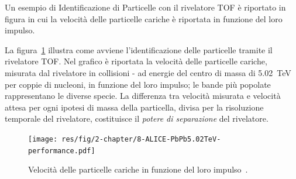     Un esempio di Identificazione di Particelle con il rivelatore TOF è riportato in figura in cui la velocità delle particelle cariche è riportata in funzione del loro impulso.

    La figura~\ref{fig:2-8-ALICE-PbPb5.02TeV-performance} illustra come avviene l'identificazione delle particelle tramite il rivelatore TOF. Nel grafico è riportata la velocità delle particelle cariche, misurata dal rivelatore in collisioni - ad energie del centro di massa di \qty{5.02}{\tera \eV} per coppie di nucleoni, in funzione del loro impulso; le bande più popolate rappresentano le diverse specie. La differenza tra velocità misurata e velocità attesa per ogni ipotesi di massa della particella, divisa per la risoluzione temporale del rivelatore, costituisce il \textit{potere di separazione} del rivelatore.

    \begin{figure}[p]
        \centering
        \texttt{[image: res/fig/2-chapter/8-ALICE-PbPb5.02TeV-performance.pdf]}
        \caption{Velocità delle particelle cariche in funzione del loro impulso~\cite{ALICE-PbPb5.02TeV-performance}.}
        \label{fig:2-8-ALICE-PbPb5.02TeV-performance}
    \end{figure}